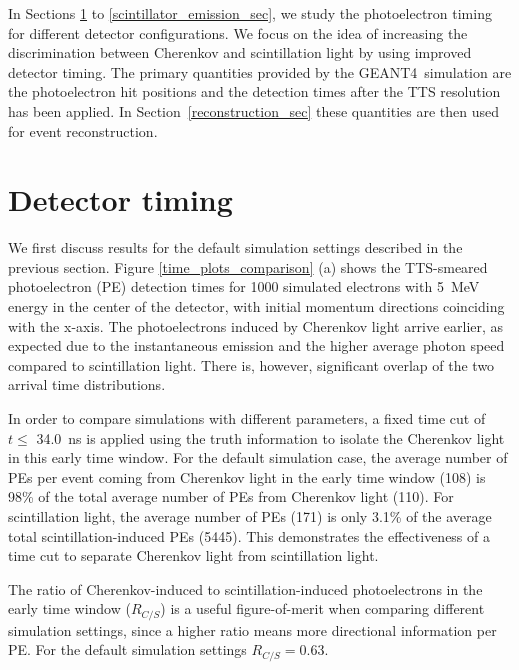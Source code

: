 \documentclass[cits]{JINST}
\newcommand{\GEANT}{GEANT4}
\begin{document}
In Sections \ref{detector_timing_sec} to
\ref{scintillator_emission_sec}, we study the
photoelectron timing for different detector configurations. We focus
on the idea of increasing the discrimination between Cherenkov and
scintillation light by using improved detector timing. The primary
quantities provided by the \GEANT~simulation are the photoelectron hit
positions and the detection times after the TTS resolution has been
applied. In Section~\ref{reconstruction_sec} these quantities are then
used for event reconstruction.

\section{Detector timing}
\label{detector_timing_sec}

We first discuss results for the default simulation settings described
in the previous section. Figure \ref{time_plots_comparison} (a) shows
the TTS-smeared photoelectron (PE) detection times for 1000 simulated
electrons with 5~MeV energy in the center of the detector, with initial
momentum directions coinciding with the x-axis. The photoelectrons
induced by Cherenkov light arrive earlier, as expected due to the
instantaneous emission and the higher average photon speed compared to
scintillation light. There is, however, significant overlap of the two
arrival time distributions.

In order to compare simulations with different parameters, a fixed
time cut of $t\leq$ 34.0~ns is applied using the truth information to
isolate the Cherenkov light in this early time window. For the default
simulation case, the average number of PEs per event coming from
Cherenkov light in the early time window (108) is 98\% of the total
average number of PEs from Cherenkov light (110). For scintillation
light, the average number of PEs (171) is only 3.1\% of the average total
scintillation-induced PEs (5445). This demonstrates the effectiveness of
a time cut to separate Cherenkov light from scintillation light. 

The ratio of Cherenkov-induced to scintillation-induced photoelectrons
in the early time window ($R_{C/S}$) is a useful figure-of-merit when
comparing different simulation settings, since a higher ratio means
more directional information per PE. For the default simulation
settings $R_{C/S}=0.63$.
\end{document}
